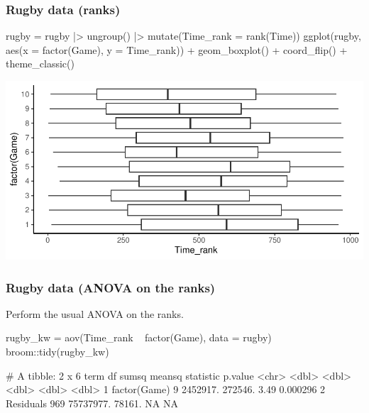 \documentclass[a4paper]{article}
\begin{document}
\subsubsection{Rugby data (ranks)}
\begin{Schunk}
\begin{Sinput}
rugby = rugby |> ungroup() |> mutate(Time_rank = rank(Time))
ggplot(rugby, aes(x = factor(Game), y = Time_rank)) + 
  geom_boxplot() + coord_flip() +
  theme_classic()
\end{Sinput}


{\centering \includegraphics[width=\maxwidth]{figure/listings-unnamed-chunk-275-1} 

}

\end{Schunk}
\subsubsection{Rugby data (ANOVA on the ranks)}
Perform the usual ANOVA on the ranks.
\begin{Schunk}
\begin{Sinput}
rugby_kw = aov(Time_rank ~ factor(Game), data = rugby)
broom::tidy(rugby_kw)
\end{Sinput}
\begin{Soutput}
# A tibble: 2 x 6
  term            df     sumsq  meansq statistic   p.value
  <chr>        <dbl>     <dbl>   <dbl>     <dbl>     <dbl>
1 factor(Game)     9  2452917. 272546.      3.49  0.000296
2 Residuals      969 75737977.  78161.     NA    NA       
\end{Soutput}
\end{Schunk}
\end{document}
